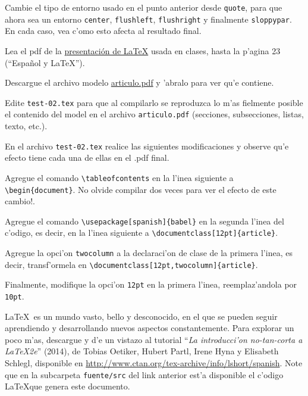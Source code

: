 \documentclass[11pt]{exam}
\begin{document}
\begin{questions}
\item Cambie el tipo de entorno usado en el punto anterior desde \texttt{quote}, para que ahora sea un entorno \texttt{center}, \texttt{flushleft}, \texttt{flushright} y finalmente \texttt{sloppypar}. En cada caso, vea c'omo esto afecta al resultado final.

\item Lea el pdf de la \href{https://github.com/gfrubi/CC/blob/master/LaTeX/clases-LaTeX.pdf}{presentaci\'on de \LaTeX} usada en clases, hasta la p'agina 23 (``Espa\~nol y \LaTeX'').

\item Descargue el archivo modelo \href{https://github.com/gfrubi/CC/blob/master/guias/03/articulo.pdf}{articulo.pdf} y 'abralo para ver qu'e contiene. 


\item Edite \texttt{test-02.tex} para que al compilarlo se reproduzca lo m'as fielmente posible el contenido del model en el archivo \texttt{articulo.pdf} (secciones, subsecciones, listas, texto, etc.).

\item En el archivo \texttt{test-02.tex} realice las siguientes modificaciones y observe qu'e efecto tiene cada una de ellas en el .pdf final.
\begin{parts}
\item Agregue el comando \verb|\tableofcontents| en la l'inea siguiente a \verb|\begin{document}|. No olvide compilar dos veces para ver el efecto de este cambio!.
\item Agregue el comando \verb|\usepackage[spanish]{babel}| en la segunda l'inea del c'odigo, es decir, en la l'inea siguiente a \verb|\documentclass[12pt]{article}|.
\item Agregue la opci'on \verb|twocolumn| a la declaraci'on de clase de la primera l'inea, es decir, transf'ormela en \verb|\documentclass[12pt,twocolumn]{article}|.
\item Finalmente, modifique la opci'on \verb|12pt| en la primera l'inea, reemplaz'andola por \verb|10pt|.
\end{parts}

\item \LaTeX\ es un mundo vasto, bello y desconocido, en el que se pueden seguir aprendiendo y desarrollando nuevos aspectos constantemente. Para explorar un poco m'as, descargue y d'e un vistazo al tutorial ``\textit{La introducci'on no-tan-corta a \LaTeX 2e}'' (2014), de Tobias Oetiker, Hubert Partl, Irene Hyna y Elisabeth Schlegl, disponible en \url{http://www.ctan.org/tex-archive/info/lshort/spanish}. Note que en la subcarpeta \texttt{fuente/src} del link anterior est'a disponible el c'odigo \LaTeX que genera este documento.


\end{questions}
\end{document}
